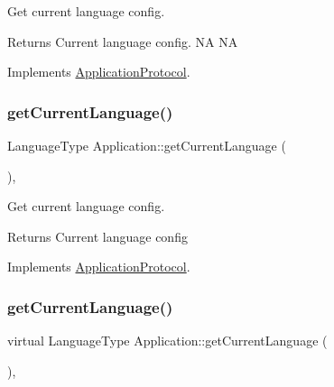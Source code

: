 Get current language config. 

\begin{DoxyReturn}{Returns}
Current language config.  NA  NA 
\end{DoxyReturn}


Implements \hyperlink{classApplicationProtocol_a44034ed02f9dd0fc59264f74f9ef9b17}{Application\+Protocol}.

\mbox{\label{classApplication_a78d257080c2dc2ff625bb4b5835667df}} 
\subsubsection{\texorpdfstring{get\+Current\+Language()}{getCurrentLanguage()}\hspace{0.1cm}{\footnotesize\ttfamily [5/12]}}
{\footnotesize\ttfamily Language\+Type Application\+::get\+Current\+Language (\begin{DoxyParamCaption}{ }\end{DoxyParamCaption})\hspace{0.3cm}{\ttfamily [override]}, {\ttfamily [virtual]}}



Get current language config. 

\begin{DoxyReturn}{Returns}
Current language config 
\end{DoxyReturn}


Implements \hyperlink{classApplicationProtocol_a44034ed02f9dd0fc59264f74f9ef9b17}{Application\+Protocol}.

\mbox{\label{classApplication_ac972f15de44614b03604fb4e3e05cab3}} 
\subsubsection{\texorpdfstring{get\+Current\+Language()}{getCurrentLanguage()}\hspace{0.1cm}{\footnotesize\ttfamily [6/12]}}
{\footnotesize\ttfamily virtual Language\+Type Application\+::get\+Current\+Language (\begin{DoxyParamCaption}{ }\end{DoxyParamCaption})\hspace{0.3cm}{\ttfamily [override]}, {\ttfamily [virtual]}}



